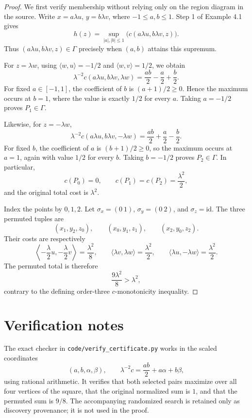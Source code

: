 \documentclass[11pt]{article}
\begin{document}
\begin{proof}
We first verify membership without relying only on the region diagram in the
source.  Write \(x=a\lambda u\), \(y=b\lambda v\), where
\(-1\leq a,b\leq1\).  Step 1 of Example 4.1 gives
\[
 h(z)=\sup_{|a|,|b|\leq1}
 \bigl(c(a\lambda u,b\lambda v,z)\bigr).
\]
Thus \((a\lambda u,b\lambda v,z)\in\Gamma\) precisely when \((a,b)\)
attains this supremum.

For \(z=\lambda w\), using
\(\langle w,u\rangle=-1/2\) and
\(\langle w,v\rangle=1/2\), we obtain
\[
 \lambda^{-2}c(a\lambda u,b\lambda v,\lambda w)
 =\frac{ab}{2}-\frac a2+\frac b2.
\]
For fixed \(a\in[-1,1]\), the coefficient of \(b\) is
\((a+1)/2\geq0\).  Hence the maximum occurs at \(b=1\), where the value is
exactly \(1/2\) for every \(a\).  Taking \(a=-1/2\) proves
\(P_1\in\Gamma\).

Likewise, for \(z=-\lambda w\),
\[
 \lambda^{-2}c(a\lambda u,b\lambda v,-\lambda w)
 =\frac{ab}{2}+\frac a2-\frac b2.
\]
For fixed \(b\), the coefficient of \(a\) is \((b+1)/2\geq0\), so the
maximum occurs at \(a=1\), again with value \(1/2\) for every \(b\).
Taking \(b=-1/2\) proves \(P_2\in\Gamma\).  In particular,
\[
 c(P_0)=0,\qquad c(P_1)=c(P_2)=\frac{\lambda^2}{2},
\]
and the original total cost is \(\lambda^2\).

Index the points by \(0,1,2\).  Let \(\sigma_x=(0\ 1)\),
\(\sigma_y=(0\ 2)\), and \(\sigma_z=\mathrm{id}\).  The three permuted
tuples are
\[
 (x_1,y_2,z_0),\qquad (x_0,y_1,z_1),\qquad (x_2,y_0,z_2).
\]
Their costs are respectively
\[
 \left\langle-\frac\lambda2u,-\frac\lambda2v\right\rangle
   =\frac{\lambda^2}{8},
 \qquad
 \langle\lambda v,\lambda w\rangle=\frac{\lambda^2}{2},
 \qquad
 \langle\lambda u,-\lambda w\rangle=\frac{\lambda^2}{2}.
\]
The permuted total is therefore
\[
 \frac{9\lambda^2}{8}>\lambda^2,
\]
contrary to the defining order-three \(c\)-monotonicity inequality.
\end{proof}

\section{Verification notes}

The exact checker in \texttt{code/verify\_certificate.py} works in the
scaled coordinates
\[
 (a,b,\alpha,\beta),\qquad
 \lambda^{-2}c=\frac{ab}{2}+a\alpha+b\beta,
\]
using rational arithmetic.  It verifies that both selected pairs maximize
over all four vertices of the square, that the original normalized sum is
\(1\), and that the permuted sum is \(9/8\).  The accompanying randomized
search is retained only as discovery provenance; it is not used in the
proof.
\end{document}
